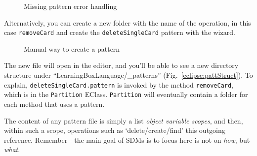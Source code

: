 \begin{itemize}
\vspace{0.5cm}

\begin{figure}[htp]
	\centering
	\vspace{0.5cm}
	\caption{Missing pattern error handling}
\end{figure}

\vspace{0.5cm}

\itemWithRightTriangle Alternatively, you can create a new folder with the name of the operation, in this case \texttt{removeCard} and create the \texttt{deleteSingleCard} pattern with the wizard.


\begin{figure}[htp]
	\centering
	
	\caption{Manual way to create a pattern}
\end{figure}

\newpage


\itemWithRightTriangle The new file will open in the editor, and you'll be able to see a new directory structure under ``LearningBoxLanguage/\_patterns''
(Fig.~\ref{eclipse:pattStruct}). To explain, \texttt{deleteSingleCard.pattern} is invoked by the method \texttt{removeCard}, which is in the \texttt{Partition}
EClass. \texttt{Partition} will eventually contain a folder for each method that uses a pattern.

\vspace{0.5cm}

\itemWithRightTriangle The content of any pattern file is simply a list \emph{object variable scopes}, and then,
within such a scope, operations such as `delete/create/find' this outgoing reference. Remember - the main goal of SDMs is to focus here is not on \emph{how},
but \emph{what}.


\end{itemize}
